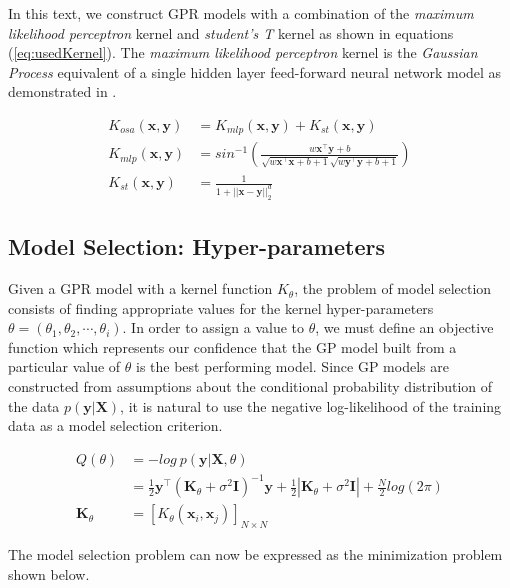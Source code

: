 \documentclass{article}
\begin{document}
In this text, we construct GPR models with a combination of the \emph{maximum likelihood perceptron} kernel and \emph{student's T} kernel as shown in equations (\ref{eq:usedKernel}). The \emph{maximum likelihood perceptron} kernel is the \emph{Gaussian Process} equivalent of a single hidden layer feed-forward neural network model as demonstrated in \citet{Neal:1996:BLN:525544}.

\begin{align}
    K_{osa}(\mathbf{x}, \mathbf{y}) & = K_{mlp}(\mathbf{x}, \mathbf{y}) + K_{st}(\mathbf{x}, \mathbf{y}) \label{eq:usedKernel} \\
    K_{mlp}(\mathbf{x}, \mathbf{y}) & = sin^{-1}(\frac{w\mathbf{x}^\intercal \mathbf{y} + b}{\sqrt{w\mathbf{x}^\intercal \mathbf{x} + b + 1} \sqrt{w\mathbf{y}^\intercal \mathbf{y} + b + 1}}) \\
    K_{st}(\mathbf{x}, \mathbf{y}) & = \frac{1}{1 + ||\mathbf{x} - \mathbf{y}||_{2}^d}
\end{align}


\subsection{Model Selection: Hyper-parameters}

Given a GPR model with a kernel function $K_\theta$, the problem of model selection consists of finding appropriate values for the kernel hyper-parameters $\theta = \left(\theta_1, \theta_2, \cdots, \theta_i\right)$. In order to assign a value to $\theta$, we must define an objective function which represents our confidence that the GP model built from a particular value of $\theta$ is the best performing model. Since GP models are constructed from assumptions about the conditional probability distribution of the data $p(\mathbf{y}|\mathbf{X})$, it is natural to use the negative log-likelihood of the training data as a model selection criterion. 

\begin{align*}
  Q(\theta) & = - log \ p(\mathbf{y}|\mathbf{X}, \theta) \\
            & = \frac{1}{2} \mathbf{y}^\intercal (\mathbf{K}_\theta + \sigma^{2} \mathbf{I})^{-1} \mathbf{y} + \frac{1}{2}|\mathbf{K}_\theta + \sigma^{2} \mathbf{I}| + \frac{N}{2}log(2\pi) \\
  \mathbf{K}_\theta & = [K_{\theta}(\mathbf{x}_i, \mathbf{x}_j)]_{N \times N}
\end{align*}

The model selection problem can now be expressed as the minimization problem shown below.
\end{document}
